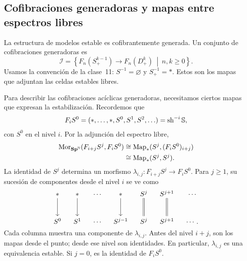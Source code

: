\subsection{Cofibraciones generadoras y mapas entre espectros libres}

La estructura de modelos estable es cofibrantemente generada. Un conjunto de cofibraciones generadoras es
\[
\mathcal I=\left\{
F_n(S^{k-1}_+)\longrightarrow F_n(D^k_+)
\ \middle|\ n,k\ge0
\right\}.
\]
Usamos la convención de la clase~11: $S^{-1}=\varnothing$ y $S^{-1}_+=*$. Estos son los mapas que adjuntan las celdas estables libres.

Para describir las cofibraciones acíclicas generadoras, necesitamos ciertos mapas que expresan la estabilización. Recordemos que
\[
F_iS^0=(*,\ldots,*,S^0,S^1,S^2,\ldots)=\operatorname{sh}^{-i}\mathbb{S},
\]
con $S^0$ en el nivel $i$. Por la adjunción del espectro libre,
\[
\begin{aligned}
\operatorname{Mor}_{\mathbf{Sp}^{\mathbb N}}(F_{i+j}S^j,F_iS^0)
&\cong\operatorname{Map}_*(S^j,(F_iS^0)_{i+j})\\
&\cong\operatorname{Map}_*(S^j,S^j).
\end{aligned}
\]
La identidad de $S^j$ determina un morfismo $\lambda_{i,j}\colon F_{i+j}S^j\to F_iS^0$. Para $j\ge1$, su sucesión de componentes desde el nivel $i$ se ve como
\[
\begin{tikzcd}[cramped,column sep=small,row sep=large]
* \arrow[d] & * \arrow[d]
& \cdots & * \arrow[d] & S^j \arrow[d,equal]
& S^{j+1} \arrow[d,equal] & \cdots\\
S^0 & S^1 & \cdots
& S^{j-1} & S^j & S^{j+1} & \cdots.
\end{tikzcd}
\]
Cada columna muestra una componente de $\lambda_{i,j}$. Antes del nivel $i+j$, son los mapas desde el punto; desde ese nivel son identidades. En particular, $\lambda_{i,j}$ es una equivalencia estable. Si $j=0$, es la identidad de $F_iS^0$.

